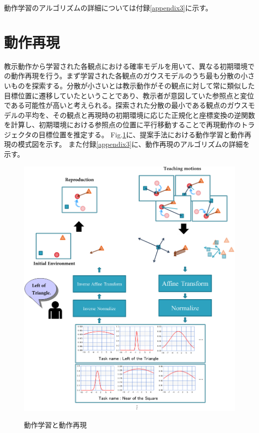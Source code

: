 動作学習のアルゴリズムの詳細については付録\ref{appendix3}に示す。


\section{動作再現}

教示動作から学習された各観点における確率モデルを用いて、異なる初期環境での動作再現を行う。まず学習された各観点のガウスモデルのうち最も分散の小さいものを探索する。分散が小さいとは教示動作がその観点に対して常に類似した目標位置に遷移していたということであり、教示者が意図していた参照点と変位である可能性が高いと考えられる。探索された分散の最小である観点のガウスモデルの平均を、その観点と再現時の初期環境に応じた正規化と座標変換の逆関数を計算し、初期環境における参照点の位置に平行移動することで再現動作のトラジェクタの目標位置を推定する。
Fig.\ref{figure:learning_and_reproduction_model}に、提案手法における動作学習と動作再現の模式図を示す。
また付録\ref{appendix3}に、動作再現のアルゴリズムの詳細を示す。
	\begin{figure}[h]
		\begin{center}
			\includegraphics[width=13cm]{chart9.png} \\ %
			\caption{動作学習と動作再現}
			\label{figure:learning_and_reproduction_model}
		\end{center}
	\end{figure}

